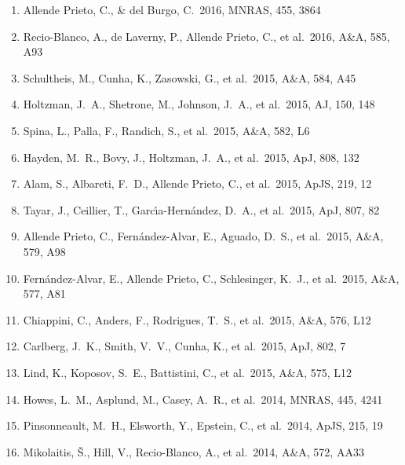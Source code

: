 \documentclass[12pt]{article}
\begin{document}
\begin{enumerate}

\item Allende Prieto, C., \& del Burgo, C.\ 2016, MNRAS, 455, 3864 


\item Recio-Blanco, A., de Laverny, P., Allende Prieto, C., et al.\ 2016, A\&A, 585, A93 


\item Schultheis, M., Cunha, K., Zasowski, G., et al.\ 2015, A\&A, 584, A45 


\item Holtzman, J.~A., 
Shetrone, M., Johnson, J.~A., et al.\ 2015, AJ, 150, 148 


\item Spina, L., Palla, F., Randich, S., et al.\ 2015, A\&A, 582, L6 


\item Hayden, M.~R., Bovy, J., 
Holtzman, J.~A., et al.\ 2015, ApJ, 808, 132 


\item Alam, S., Albareti, F.~D., 
Allende Prieto, C., et al.\ 2015, ApJS, 219, 12 


\item Tayar, J., Ceillier, T., 
Garc{\'{\i}}a-Hern{\'a}ndez, D.~A., et al.\ 2015, ApJ, 807, 82 


\item Allende Prieto, C., Fern{\'a}ndez-Alvar, E., Aguado, D.~S., et al.\ 2015, A\&A, 579, A98 


\item  Fern{\'a}ndez-Alvar, E., Allende Prieto, C., Schlesinger, K.~J., et al.\ 2015, A\&A, 577, A81 


\item Chiappini, C., Anders, F., Rodrigues, T.~S., et al.\ 2015, A\&A, 576, L12 


\item Carlberg, J.~K., Smith, V.~V., Cunha, K., et al.\ 2015, ApJ, 802, 7 


\item Lind, K., Koposov, S.~E., Battistini, C., et al.\ 2015, A\&A, 575, L12 


\item Howes, L.~M., Asplund, 
M., Casey, A.~R., et al.\ 2014, MNRAS, 445, 4241 


\item Pinsonneault, 
M.~H., Elsworth, Y., Epstein, C., et al.\ 2014, ApJS, 215, 19 


\item Mikolaitis, {\v S}., Hill, V., Recio-Blanco, A., et al.\ 2014, A\&A, 572, AA33 



\end{enumerate}
\end{document}
